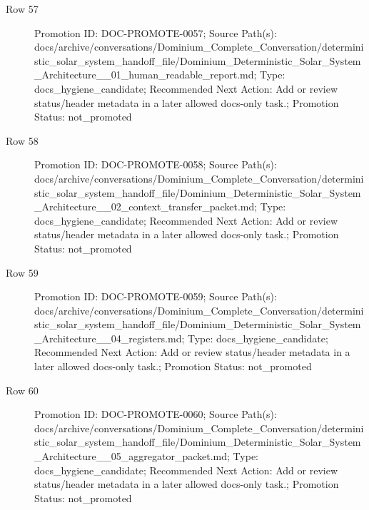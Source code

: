 \documentclass[9pt,a4paper,openany]{book}
\begin{document}
\begin{description}
\item[Row 57] Promotion ID: DOC-\allowbreak{}PROMOTE-\allowbreak{}0057; Source Path(s): docs/\allowbreak{}archive/\allowbreak{}conversations/\allowbreak{}Dominium\_\allowbreak{}Complete\_\allowbreak{}Conversation/\allowbreak{}deterministic\_\allowbreak{}solar\_\allowbreak{}system\_\allowbreak{}handoff\_\allowbreak{}file/\allowbreak{}Dominium\_\allowbreak{}Deterministic\_\allowbreak{}Solar\_\allowbreak{}System\_\allowbreak{}Architecture\_\allowbreak{}\_\allowbreak{}01\_\allowbreak{}human\_\allowbreak{}readable\_\allowbreak{}report.\allowbreak{}md; Type: docs\_\allowbreak{}hygiene\_\allowbreak{}candidate; Recommended Next Action: Add or review status/\allowbreak{}header metadata in a later allowed docs-\allowbreak{}only task.\allowbreak{}; Promotion Status: not\_\allowbreak{}promoted
\item[Row 58] Promotion ID: DOC-\allowbreak{}PROMOTE-\allowbreak{}0058; Source Path(s): docs/\allowbreak{}archive/\allowbreak{}conversations/\allowbreak{}Dominium\_\allowbreak{}Complete\_\allowbreak{}Conversation/\allowbreak{}deterministic\_\allowbreak{}solar\_\allowbreak{}system\_\allowbreak{}handoff\_\allowbreak{}file/\allowbreak{}Dominium\_\allowbreak{}Deterministic\_\allowbreak{}Solar\_\allowbreak{}System\_\allowbreak{}Architecture\_\allowbreak{}\_\allowbreak{}02\_\allowbreak{}context\_\allowbreak{}transfer\_\allowbreak{}packet.\allowbreak{}md; Type: docs\_\allowbreak{}hygiene\_\allowbreak{}candidate; Recommended Next Action: Add or review status/\allowbreak{}header metadata in a later allowed docs-\allowbreak{}only task.\allowbreak{}; Promotion Status: not\_\allowbreak{}promoted
\item[Row 59] Promotion ID: DOC-\allowbreak{}PROMOTE-\allowbreak{}0059; Source Path(s): docs/\allowbreak{}archive/\allowbreak{}conversations/\allowbreak{}Dominium\_\allowbreak{}Complete\_\allowbreak{}Conversation/\allowbreak{}deterministic\_\allowbreak{}solar\_\allowbreak{}system\_\allowbreak{}handoff\_\allowbreak{}file/\allowbreak{}Dominium\_\allowbreak{}Deterministic\_\allowbreak{}Solar\_\allowbreak{}System\_\allowbreak{}Architecture\_\allowbreak{}\_\allowbreak{}04\_\allowbreak{}registers.\allowbreak{}md; Type: docs\_\allowbreak{}hygiene\_\allowbreak{}candidate; Recommended Next Action: Add or review status/\allowbreak{}header metadata in a later allowed docs-\allowbreak{}only task.\allowbreak{}; Promotion Status: not\_\allowbreak{}promoted
\item[Row 60] Promotion ID: DOC-\allowbreak{}PROMOTE-\allowbreak{}0060; Source Path(s): docs/\allowbreak{}archive/\allowbreak{}conversations/\allowbreak{}Dominium\_\allowbreak{}Complete\_\allowbreak{}Conversation/\allowbreak{}deterministic\_\allowbreak{}solar\_\allowbreak{}system\_\allowbreak{}handoff\_\allowbreak{}file/\allowbreak{}Dominium\_\allowbreak{}Deterministic\_\allowbreak{}Solar\_\allowbreak{}System\_\allowbreak{}Architecture\_\allowbreak{}\_\allowbreak{}05\_\allowbreak{}aggregator\_\allowbreak{}packet.\allowbreak{}md; Type: docs\_\allowbreak{}hygiene\_\allowbreak{}candidate; Recommended Next Action: Add or review status/\allowbreak{}header metadata in a later allowed docs-\allowbreak{}only task.\allowbreak{}; Promotion Status: not\_\allowbreak{}promoted

\end{description}
\end{document}
